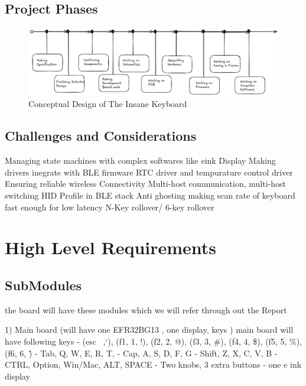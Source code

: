 \documentclass[a4paper,11pt]{article}%
\begin{document}
\subsection{Project Phases}

\begin{figure}[H]
    \centering
    \includegraphics[scale=0.34]{figures/Timeline.png}
    \caption{Conceptual Design of The Insane Keyboard}
\end{figure}
\vspace{0.2cm}



\subsection{Challenges and Considerations}

Managing state machines with complex softwares like eink Display
Making drivers inegrate with BLE firmware
RTC driver and tempurature control driver 
Ensuring reliable wireless Connectivity
Multi-host communication, multi-host switching
HID Profile in BLE stack 
Anti ghosting 
making scan rate of keyboard fast enough for low latency
N-Key rollover/ 6-key rollover



\section{High Level Requirements}

\subsection{SubModules}

the board will have these modules which we will refer through out the Report

1) Main board (will have one EFR32BG13 , one display, keys )
main board will have following keys 
- (esc ~,`), (f1, 1, !), (f2, 2, @), (f3, 3, \#), (f4, 4, \$), (f5, 5, \%), (f6, 6, \^)
- Tab, Q, W, E, R, T,
- Cap, A, S, D, F, G
- Shift, Z, X, C, V, B
- CTRL, Option, Win/Mac, ALT, SPACE
- Two knobs, 3 extra buttons 
- one e ink display
\end{document}
